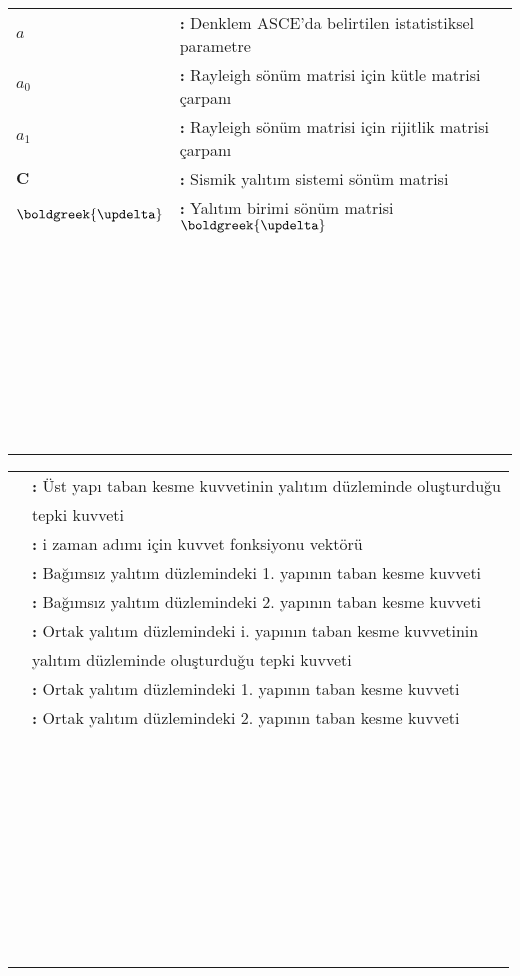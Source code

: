 \noindent \hspace{-3mm} %
\begin{tabular}{p{2cm}l}
$a$  & \textbf{:} Denklem ASCE'da belirtilen istatistiksel parametre \tabularnewline
$a_{0}$  & \textbf{:} Rayleigh sönüm matrisi için kütle matrisi çarpanı \tabularnewline
$a_{1}$  & \textbf{:} Rayleigh sönüm matrisi için rijitlik matrisi çarpanı \tabularnewline
$\mathbf{C}$ & \textbf{:} Sismik yalıtım sistemi sönüm matrisi \tabularnewline
$\boldgreek{\updelta}$ & \textbf{:} Yalıtım birimi sönüm matrisi $\boldgreek{\updelta}$\tabularnewline
 & \tabularnewline
 & \tabularnewline
 & \tabularnewline
 & \tabularnewline
 & \tabularnewline
 & \tabularnewline
 & \tabularnewline
 & \tabularnewline
 & \tabularnewline
 & \tabularnewline
 & \tabularnewline
 & \tabularnewline
 & \tabularnewline
 & \tabularnewline
 & \tabularnewline
 & \tabularnewline
 & \tabularnewline
 & \tabularnewline
 & \tabularnewline
 & \tabularnewline
 & \tabularnewline
 & \tabularnewline
 & \tabularnewline
 & \tabularnewline
 & \tabularnewline
 & \tabularnewline
 & \tabularnewline
 & \tabularnewline
 & \tabularnewline
 & \tabularnewline
 & \tabularnewline
 & \tabularnewline
 & \tabularnewline
 & \tabularnewline
 & \tabularnewline
 & \tabularnewline
\end{tabular}

\begin{tabular}{p{2cm}l}
 & \textbf{:} Üst yapı taban kesme kuvvetinin yalıtım düzleminde oluşturduğu \tabularnewline
 & tepki kuvveti \tabularnewline
 & \textbf{:} i zaman adımı için kuvvet fonksiyonu vektörü \tabularnewline
 & \textbf{:} Bağımsız yalıtım düzlemindeki 1. yapının taban kesme kuvveti \tabularnewline
 & \textbf{:} Bağımsız yalıtım düzlemindeki 2. yapının taban kesme kuvveti \tabularnewline
 & \textbf{:} Ortak yalıtım düzlemindeki i. yapının taban kesme kuvvetinin \tabularnewline
 & yalıtım düzleminde oluşturduğu tepki kuvveti \tabularnewline
 & \textbf{:} Ortak yalıtım düzlemindeki 1. yapının taban kesme kuvveti \tabularnewline
 & \textbf{:} Ortak yalıtım düzlemindeki 2. yapının taban kesme kuvveti \tabularnewline
 & \tabularnewline
 & \tabularnewline
 & \tabularnewline
 & \tabularnewline
 & \tabularnewline
 & \tabularnewline
 & \tabularnewline
 & \tabularnewline
 & \tabularnewline
 & \tabularnewline
 & \tabularnewline
 & \tabularnewline
 & \tabularnewline
 & \tabularnewline
 & \tabularnewline
 & \tabularnewline
 & \tabularnewline
 & \tabularnewline
 & \tabularnewline
 & \tabularnewline
 & \tabularnewline
 & \tabularnewline
 & \tabularnewline
 & \tabularnewline
 & \tabularnewline
 & \tabularnewline
 & \tabularnewline
 & \tabularnewline
 & \tabularnewline
 & \tabularnewline
 & \tabularnewline
 & \tabularnewline
 & \tabularnewline
 & \tabularnewline
 & \tabularnewline
 & \tabularnewline
 & \tabularnewline
 & \tabularnewline
 & \tabularnewline
\end{tabular}
